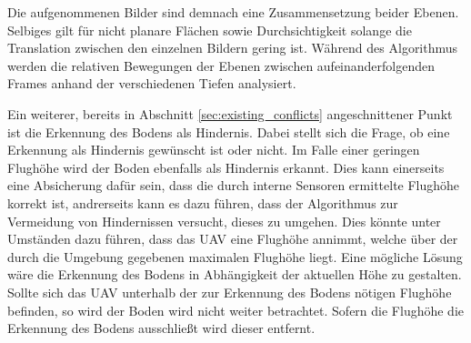 \noindent
Die aufgenommenen Bilder sind demnach eine Zusammensetzung beider Ebenen. Selbiges gilt für nicht planare Flächen sowie Durchsichtigkeit solange die Translation zwischen den einzelnen Bildern gering ist. Während des Algorithmus werden die relativen Bewegungen der Ebenen zwischen aufeinanderfolgenden Frames anhand der verschiedenen Tiefen analysiert.

\noindent
Ein weiterer, bereits in Abschnitt \ref{sec:existing_conflicts} angeschnittener Punkt ist die Erkennung des Bodens als Hindernis. Dabei stellt sich die Frage, ob eine Erkennung als Hindernis gewünscht ist oder nicht. Im Falle einer geringen Flughöhe wird der Boden ebenfalls als Hindernis erkannt. Dies kann einerseits eine Absicherung dafür sein, dass die durch interne Sensoren ermittelte Flughöhe korrekt ist, andrerseits kann es dazu führen, dass der Algorithmus zur Vermeidung von Hindernissen versucht, dieses zu  umgehen. Dies könnte unter Umständen dazu führen, dass das UAV eine Flughöhe annimmt, welche über der durch die Umgebung gegebenen maximalen Flughöhe liegt. Eine mögliche Lösung wäre die Erkennung des Bodens in Abhängigkeit der aktuellen Höhe zu gestalten. Sollte sich das UAV unterhalb der zur Erkennung des Bodens nötigen Flughöhe befinden, so wird der Boden wird nicht weiter betrachtet. Sofern die Flughöhe die Erkennung des Bodens ausschließt wird dieser entfernt.
